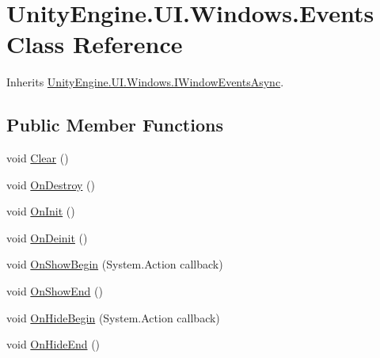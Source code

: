 \hypertarget{class_unity_engine_1_1_u_i_1_1_windows_1_1_events}{}\section{Unity\+Engine.\+U\+I.\+Windows.\+Events Class Reference}
\label{class_unity_engine_1_1_u_i_1_1_windows_1_1_events}


Inherits \hyperlink{interface_unity_engine_1_1_u_i_1_1_windows_1_1_i_window_events_async}{Unity\+Engine.\+U\+I.\+Windows.\+I\+Window\+Events\+Async}.

\subsection*{Public Member Functions}
\begin{DoxyCompactItemize}
\item 
void \hyperlink{class_unity_engine_1_1_u_i_1_1_windows_1_1_events_a0cbaa244f8b360edff7c082a08955cbf}{Clear} ()
\item 
void \hyperlink{class_unity_engine_1_1_u_i_1_1_windows_1_1_events_a8fc3531a1393aabbf3ce2b57c82b9785}{On\+Destroy} ()
\item 
void \hyperlink{class_unity_engine_1_1_u_i_1_1_windows_1_1_events_ab6afde0e0eb1c10a64cff6a9ec422d44}{On\+Init} ()
\item 
void \hyperlink{class_unity_engine_1_1_u_i_1_1_windows_1_1_events_a0288808124c86382568126812f19caab}{On\+Deinit} ()
\item 
void \hyperlink{class_unity_engine_1_1_u_i_1_1_windows_1_1_events_a3b844accf5677b1b18bbd7dd55ce4c77}{On\+Show\+Begin} (System.\+Action callback)
\item 
void \hyperlink{class_unity_engine_1_1_u_i_1_1_windows_1_1_events_a15254d5b4ae80277975b3902d8fcfd3d}{On\+Show\+End} ()
\item 
void \hyperlink{class_unity_engine_1_1_u_i_1_1_windows_1_1_events_a25a942b6f95fb6f5b511bd10465155f2}{On\+Hide\+Begin} (System.\+Action callback)
\item 
void \hyperlink{class_unity_engine_1_1_u_i_1_1_windows_1_1_events_aa5ec2dd5969666e93474324f5b12b8e1}{On\+Hide\+End} ()
\end{DoxyCompactItemize}
